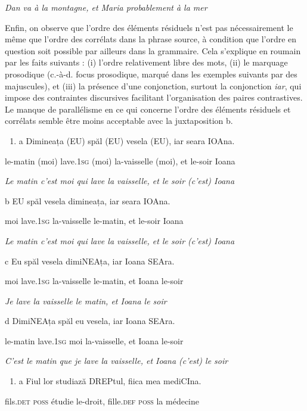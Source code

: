     \textit{Dan va à la montagne, et Maria probablement à la mer} 

Enfin, on observe que l'ordre des éléments résiduels n'est pas nécessairement le même que l'ordre des corrélats dans la phrase source, à condition que l'ordre en question soit possible par ailleurs dans la grammaire. Cela s'explique en roumain par les faits suivants : (i) l'ordre relativement libre des mots, (ii) le marquage prosodique (c.-à-d. focus prosodique, marqué dans les exemples suivants par des majuscules), et (iii) la présence d'une conjonction, surtout la conjonction \textit{iar}, qui impose des contraintes discursives facilitant l'organisation des paires contrastives. Le manque de parallélisme en ce qui concerne l'ordre des éléments résiduels et corrélats semble être moins acceptable avec la juxtaposition b.  


\begin{enumerate}
\item a  Dimineața (EU) spăl (EU) vesela (EU), iar seara IOAna.


\end{enumerate}
le-matin (moi) lave.\textsc{1sg} (moi) la-vaisselle (moi), et le-soir Ioana 

\textit{Le matin c'est moi qui lave la vaisselle, et le soir (c'est) Ioana}  

  b  EU spăl vesela dimineața, iar seara IOAna.

moi lave.\textsc{1sg} la-vaisselle le-matin, et le-soir Ioana

{\itshape
Le matin c'est moi qui lave la vaisselle, et le soir (c'est) Ioana}

  c  Eu spăl vesela dimiNEAța, iar Ioana SEAra.

moi lave.\textsc{1sg} la-vaisselle le-matin, et Ioana le-soir

{\itshape
Je lave la vaisselle le matin, et Ioana le soir } 

  d  DimiNEAța spăl eu vesela, iar Ioana SEAra.

    le-matin lave.\textsc{1sg} moi la-vaisselle, et Ioana le-soir

{\itshape
C'est le matin que je lave la vaisselle, et Ioana (c'est) le soir} 


\begin{enumerate}
\item \label{bkm:Ref289427373}a  Fiul lor studiază DREPtul, fiica mea mediCIna.


\end{enumerate}
fils.\textsc{det poss} étudie le-droit, fille\textsc{.def poss} la médecine 

